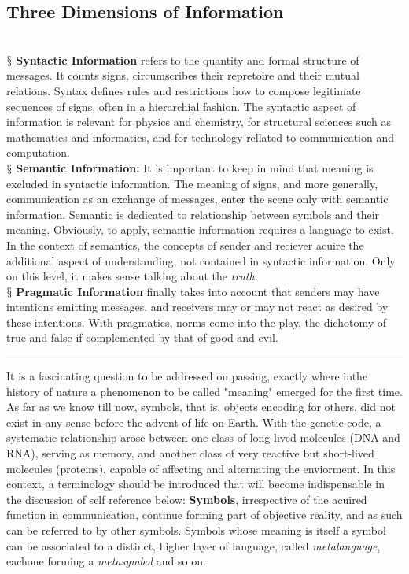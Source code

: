 \documentclass[9pt,a4paper, twocolumn]{article}
\newcommand{\newpoint}[1]{\ \\ \indent$\mathsection$ \textbf{#1}}
\newcommand{\distinct}{ \\ \hrule}
\begin{document}
        \subsection{Three Dimensions of Information}
            \newpoint{Syntactic Information} refers to the quantity and formal structure of messages. It counts signs, circumscribes their repretoire and their mutual relations. Syntax defines rules and restrictions how to compose legitimate sequences of signs, often in a hierarchial fashion. The syntactic aspect of information is relevant for physics and chemistry, for structural sciences such as mathematics and informatics, and for technology rellated to communication and computation. 
            \newpoint{Semantic Information:} It is important to keep in mind that meaning is excluded in syntactic information. The meaning of signs, and more generally, communication as an exchange of messages, enter the scene only with semantic information. Semantic is dedicated to relationship between symbols and their meaning. Obviously, to apply, semantic information requires a language to exist. In the context of semantics, the concepts of sender and reciever acuire the additional aspect of understanding, not contained in syntactic information. Only on this level, it makes sense talking about the \textit{truth}.
            \newpoint{Pragmatic Information} finally takes into account that senders may have intentions emitting messages, and receivers may or may not react as desired by these intentions. With pragmatics, norms come into the play, the dichotomy of true and false if complemented by that of good and evil.
            \distinct
            It is a fascinating question to be addressed on passing, exactly where inthe history of nature a phenomenon to be called "meaning" emerged for the first time. As far as we know till now, symbols, that is, objects encoding for others, did not exist in any sense before the advent of life on Earth. With the genetic code, a systematic relationship arose between one class of long-lived molecules (DNA and RNA), serving as memory, and another class of very reactive but short-lived molecules (proteins), capable of affecting and alternating the enviorment. In this context, a terminology should be introduced that will become indispensable in the discussion of self reference below: \textbf{Symbols}, irrespective of the acuired function in communication, continue forming part of objective reality, and as such can be referred to by other symbols. Symbols whose meaning is itself a symbol can be associated to a distinct, higher layer of language, called \textit{metalanguage}, eachone forming a \textit{metasymbol} and so on. 
\end{document}
